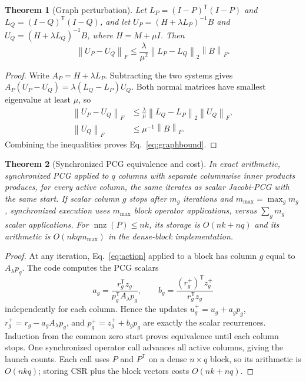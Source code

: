\documentclass[10pt,letterpaper,twoside]{article}
\newtheorem{theorem}{Theorem}
\newcommand{\norm}[1]{\left\lVert #1\right\rVert}
\newcommand{\trans}{\mathsf T}
\begin{document}
\begin{theorem}[Graph perturbation]
\label{thm:graphperturb}
Let $L_P=(I-P)^\trans(I-P)$ and $L_Q=(I-Q)^\trans(I-Q)$, and let
$U_P=(H+\lambda L_P)^{-1}B$ and $U_Q=(H+\lambda L_Q)^{-1}B$, where
$H=M+\mu I$.  Then
\begin{equation}
 \norm{U_P-U_Q}_F\le
 \frac{\lambda}{\mu^2}\norm{L_P-L_Q}_2\norm{B}_F.
\label{eq:graphbound}
\end{equation}
\end{theorem}
\begin{proof}
Write $A_P=H+\lambda L_P$.  Subtracting the two systems gives
$A_P(U_P-U_Q)=\lambda(L_Q-L_P)U_Q$.  Both normal matrices have smallest
eigenvalue at least $\mu$, so
\begin{align}
 \norm{U_P-U_Q}_F
 &\le\frac{\lambda}{\mu}\norm{L_Q-L_P}_2\norm{U_Q}_F,\\
 \norm{U_Q}_F&\le\mu^{-1}\norm{B}_F.
\end{align}
Combining the inequalities proves Eq.~\eqref{eq:graphbound}.
\end{proof}

\begin{theorem}[Synchronized PCG equivalence and cost]
\label{thm:batch}
In exact arithmetic, synchronized PCG applied to $q$ columns with separate
columnwise inner products produces, for every active column, the same iterates
as scalar Jacobi-PCG with the same start.  If scalar column $g$ stops after
$m_g$ iterations and $m_{\max}=\max_g m_g$, synchronized execution uses
$m_{\max}$ block operator applications, versus $\sum_gm_g$ scalar applications.
For $\operatorname{nnz}(P)\le nk$, its storage is $O(nk+nq)$ and its arithmetic
is $O(nkq m_{\max})$ in the dense-block implementation.
\end{theorem}
\begin{proof}
At any iteration, Eq.~\eqref{eq:action} applied to a block has column $g$ equal
to $A_\lambda p_g$.  The code computes the PCG scalars
\begin{equation}
 a_g=\frac{r_g^\trans z_g}{p_g^\trans A_\lambda p_g},\qquad
 b_g=\frac{(r_g^+)^\trans z_g^+}{r_g^\trans z_g}
\end{equation}
independently for each column.  Hence the updates
$u_g^+=u_g+a_gp_g$, $r_g^+=r_g-a_gA_\lambda p_g$, and
$p_g^+=z_g^++b_gp_g$ are exactly the scalar recurrences.  Induction from the
common zero start proves equivalence until each column stops.  One synchronized
operator call advances all active columns, giving the launch counts.  Each call
uses $P$ and $P^\trans$ on a dense $n\times q$ block, so its arithmetic is
$O(nkq)$; storing CSR plus the block vectors costs $O(nk+nq)$.
\end{proof}
\end{document}
